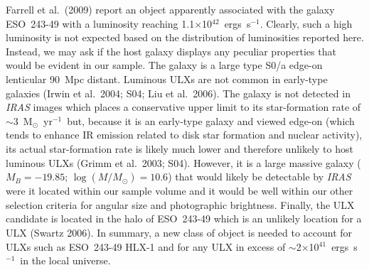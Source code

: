 \documentclass{article}
\newcommand{\msfr}{M$_{\odot}$~yr$^{-1}$}
\newcommand{\ergl}{ergs~s$^{-1}$}
\newcommand{\etal}{et al.}
\begin{document}
Farrell \etal\ (2009) report an object apparently associated with the galaxy ESO~243-49 with a luminosity
 reaching 1.1$\times$10$^{42}$~\ergl. 
Clearly, such a high luminosity is not expected based on the distribution of luminosities reported here.
Instead, we may ask if the host galaxy displays any peculiar properties that would be evident in our sample.
The galaxy is a large type S0/a edge-on lenticular 90~Mpc distant. 
Luminous ULXs are not common in early-type galaxies (Irwin \etal\ 2004; S04; Liu \etal\ 2006).
The galaxy is not detected in {\sl IRAS} images which places a conservative upper limit to its star-formation rate
 of $\sim$3~\msfr\ but,
because it is an early-type galaxy and viewed edge-on (which tends to enhance IR 
 emission related to disk star formation and nuclear activity), its actual star-formation rate is likely
 much lower and therefore unlikely to host luminous ULXs (Grimm \etal\ 2003; S04).
However, it is a large massive galaxy ($M_B = -19.85$; $\log(M/M_{\odot})=10.6$) that 
 would likely be detectable by {\sl IRAS}  were it located within our sample volume and it would
 be well within our other selection criteria for angular size and photographic brightness.
Finally, the ULX candidate is located in the halo of ESO~243-49 which is an unlikely location
 for a ULX (Swartz 2006).
In summary, a new class of object is needed to account for ULXs such as ESO~243-49 HLX-1 and for any
 ULX in excess of $\sim$2$\times$10$^{41}$~\ergl\ in the local universe.
\end{document}
